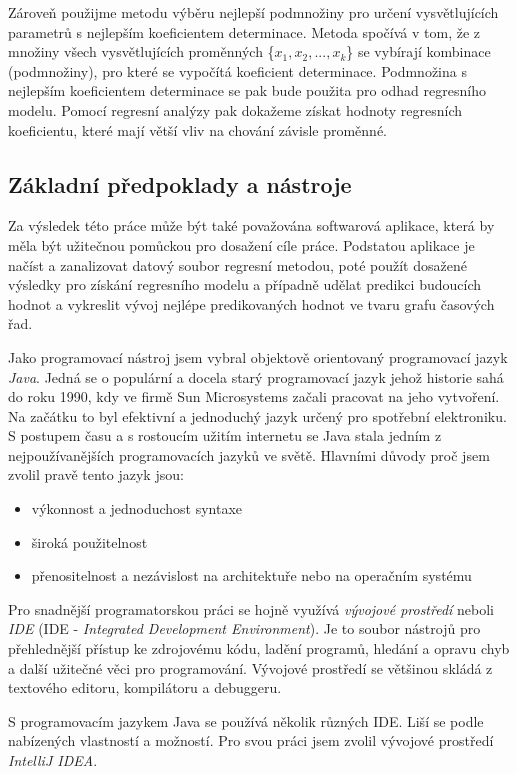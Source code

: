 \documentclass[a4paper,12pt,twoside]{scrreprt}
\begin{document}
Zároveň použijme metodu výběru nejlepší podmnožiny pro určení vysvětlujících parametrů s nejlepším koeficientem determinace. Metoda spočívá v tom, že z množiny všech vysvětlujících proměnných \{$x_1, x_2, ..., x_k$\} se vybírají kombinace (podmnožiny), pro které se vypočítá koeficient determinace. Podmnožina s nejlepším koeficientem determinace se pak bude použita pro odhad regresního modelu. Pomocí regresní analýzy pak dokažeme získat hodnoty regresních koeficientu, které mají větší vliv na chování závisle proměnné. 

\subsection{Základní předpoklady a nástroje}
Za výsledek této práce může být také považována softwarová aplikace, která by měla být užitečnou pomůckou pro dosažení cíle práce. Podstatou aplikace je načíst a zanalizovat datový soubor regresní metodou, poté použít dosažené výsledky pro získání regresního modelu a případně udělat predikci budoucích hodnot a vykreslit vývoj nejlépe predikovaných hodnot ve tvaru grafu časových řad. 

Jako programovací nástroj jsem vybral objektově orientovaný programovací jazyk \textit{Java}. Jedná se o populární a docela starý programovací jazyk jehož historie sahá do roku 1990, kdy ve firmě Sun Microsystems začali pracovat na jeho vytvoření. Na začátku to byl efektivní a jednoduchý jazyk určený pro spotřební elektroniku. S postupem času a s rostoucím užitím internetu se Java stala jedním z nejpoužívanějších programovacích jazyků ve světě. Hlavními důvody proč jsem zvolil pravě tento jazyk jsou: 

\begin{itemize}
\item výkonnost a jednoduchost syntaxe
\item široká použitelnost
\item přenositelnost a nezávislost na architektuře nebo na operačním systému
\end{itemize} 

Pro snadnější programatorskou práci se hojně využívá \textit{vývojové prostředí} neboli \textit{IDE} (IDE - \textit{Integrated Development Environment}). Je to soubor nástrojů pro přehlednější přístup ke zdrojovému kódu, ladění programů, hledání a opravu chyb a další užitečné věci pro programování. Vývojové prostředí se většinou skládá z textového editoru, kompilátoru a debuggeru. 

S programovacím jazykem Java se používá několik různých IDE. Liší se podle nabízených vlastností a možností. Pro svou práci jsem zvolil vývojové prostředí \textit{IntelliJ IDEA}. 
\end{document}
